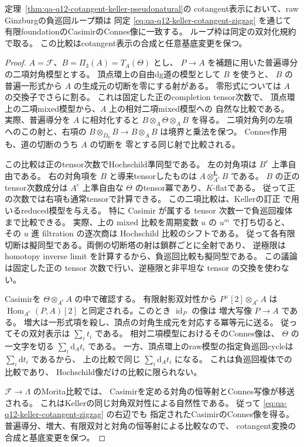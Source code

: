\begin{corollary}[cotangent表示でのrawループ類とCasimir類]
\label{cor:qa-raw-loop-cotangent-casimir}
定理~\ref{thm:qa-q12-cotangent-keller-pseudonatural}の
cotangent表示において、raw Ginzburgの負巡回ループ類は
同定 \eqref{eq:qa-q12-keller-cotangent-zigzag} を通じて
有限foundationのCasimirのConnes像に一致する。
ループ枠は同定の双対化規約で取る。
この比較はcotangent表示の合成と任意基底変更を保つ。
\end{corollary}
\begin{proof}
$A=\mathscr F$、$B=\Pi_3(A)=T_A(\Theta)$ とし、
$P\to A$ を補題に用いた普遍導分の二項対角模型とする。
頂点環上の自由dg道の模型として $B$ を使うと、
$B$ の普遍一形式から $A$ の生成元の切断を零にする射がある。
零形式については $A$ の交換子でさらに割る。
これは固定した正のcompletion tensor次数で、
頂点環上の二項mixed模型から、$A$ 上の相対二項mixed模型への
自然な比較である。
実際、普遍導分を $A$ に相対化すると
$B\otimes_A\Theta\otimes_A B$ を得る。
二項対角列の左項へのこの射と、右項の
$B\otimes_{D_0}B\to B\otimes_A B$ は境界と乗法を保つ。
Connes作用も、道の切断のうち $A$ の切断を
零とする同じ射で比較される。

この比較は正のtensor次数でHochschild準同型である。
左の対角項は $B^e$ 上準自由である。
右の対角項を $B$ と導来tensorしたものは
$A\otimes_{A^e}^{\mathbf L}B$ である。
$B$ の正のtensor次数成分は $A^e$ 上準自由な
$\Theta$ のtensor冪であり、$K$-flatである。
従って正の次数では右項も通常tensorで計算できる。
この二項比較は、Kellerの訂正
\cite[Theorem~1.1の証明，pp.~2--3]{KellerErratumCY2018}
で用いるreduced模型を与える。
特に Casimir が属する tensor 次数一で負巡回複体まで比較できる。
実際、上の mixed 比較を周期変数 $u$ の $u^m$ で打ち切ると、
その $u$ 進 filtration の逐次商は Hochschild 比較のシフトである。
従って各有限切断は擬同型である。両側の切断塔の射は鎖群ごとに全射であり、
逆極限は homotopy inverse limit を計算するから、負巡回比較も擬同型である。
この議論は固定した正の tensor 次数で行い、逆極限と非平坦な tensor の交換を使わない。

Casimirを $\Theta\otimes_{A^e} A$ の中で確認する。
有限射影双対性から
$P^\vee[2]\otimes_{A^e}A$ は $\operatorname{Hom}_{A^e}(P,A)[2]$
と同定される。このとき $\operatorname{id}_P$ の像は
増大写像 $P\to A$ である。
増大は一形式項を殺し、頂点の対角生成元を対応する冪等元に送る。
従ってその双対表示は $\sum_i t_i$ である。
相対二項模型におけるそのConnes像は、
$\Theta$ の一文字を切る $\sum_i\mathrm d_A t_i$ である。
一方、頂点環上のraw模型の指定負巡回cycleは
$\sum_i\mathrm d t_i$ であるから、
上の比較で同じ $\sum_i\mathrm d_A t_i$ になる。
これは負巡回複体での比較であり、
Hochschild像だけの比較に限られない。

$\mathscr F\to\Lambda$ のMorita比較では、
Casimirを定める対角の恒等射とConnes写像が移送される。
これはKellerの同じ対角双対性による自然性である。
従って \eqref{eq:qa-q12-keller-cotangent-zigzag} の右辺でも
指定されたCasimirのConnes像を得る。
普遍導分、増大、有限双対と対角の恒等射による比較なので、
cotangent変換の合成と基底変更を保つ。
\end{proof}

